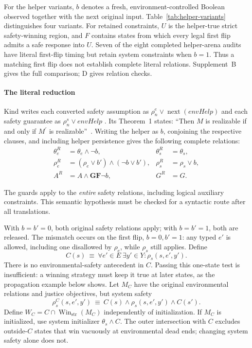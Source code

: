 For the helper variants, $b$ denotes a fresh, environment-controlled
Boolean observed together with the next original input.
Table~\ref{tab:helper-variants} distinguishes four variants.
For retained constraints, $U$ is the helper-true strict safety-winning
region, and $F$ contains states from which every legal first flip
admits a safe response into $U$.
Seven of the eight completed helper-arena audits have literal
first-flip timing but retain system constraints when $b=1$.
Thus a matching first flip does not establish complete literal
relations. Supplement~B gives the full comparison; D gives relation checks.
\begin{samepage}
\paragraph{The literal reduction}
Kind writes each converted safety assumption as
$\rho_n^e\lor\operatorname{next}(\mathit{envHelp})$ and each
safety guarantee as $\rho_n^s\lor\mathit{envHelp}$
\cite[Sec.~4.1, p.~4]{kind}.
Its Theorem~1 states: ``Then $M$ is realizable if and only if
$M^\prime$ is realizable''~\cite[p.~5]{kind}.
Writing the helper as $b$, conjoining the respective clauses, and
including helper persistence gives the following complete relations:
\begin{align}
 \theta_e^R &= \theta_e\land\neg b,
 &\theta_s^R &= \theta_s, \nonumber\\
 \rho_e^R &= (\rho_e\lor b')\land(\neg b\lor b'),
 &\rho_s^R &= \rho_s\lor b, \label{hpb:literal}\\
 A^R &= A\land\mathbf{G}\mathbf{F}\neg b,
 &G^R &= G. \nonumber
\end{align}
\end{samepage}
The guards apply to the \emph{entire} safety relations, including
logical auxiliary constraints. This semantic hypothesis must be
checked for a syntactic route after all translations.

With $b=b'=0$, both original safety relations apply; with $b=b'=1$,
both are released. The mismatch occurs on the first flip, $b=0,b'=1$:
any typed $e'$ is allowed, including one disallowed by $\rho_e$,
while $\rho_s$ still applies. Define
\begin{equation}
 C(s)\ \equiv\ \forall e'\in E\ \exists y'\in Y:
                    \rho_s(s,e',y').
 \label{hpb:C}
\end{equation}
There is no environmental-safety antecedent in $C$. Passing this one-state test is insufficient: a winning strategy must keep it true at later states, as the propagation example below shows.
Let $M_C$ have the original environmental relations and justice
objectives, but system safety
\begin{equation}
 \rho_s^C(s,e',y')\ \equiv\
 C(s)\land\rho_s(s,e',y')\land C(s').
 \label{hpb:C-invariant}
\end{equation}
Define $W_C=C\cap\operatorname{Win}_{\mathrm{str}}(M_C)$ independently
of initialization. If $M_C$ is initialized, use system initializer
$\theta_s\land C$. The outer intersection with $C$ excludes
outside-$C$ states that win vacuously at environmental dead ends;
changing system safety alone does not.

